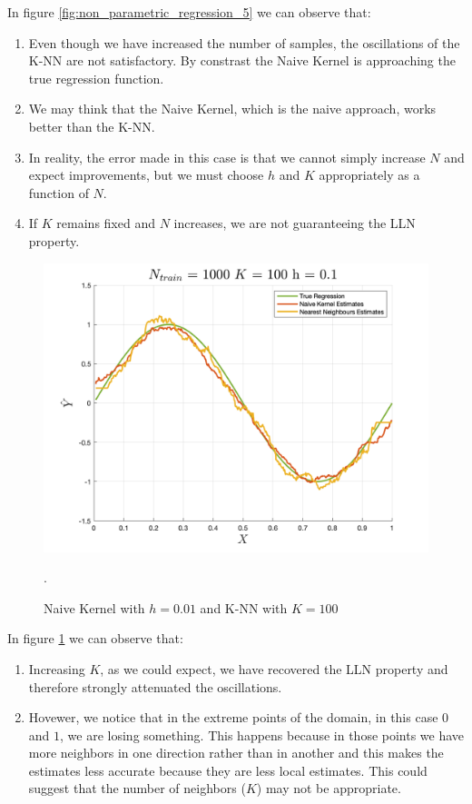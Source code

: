 In figure \ref*{fig:non_parametric_regression_5} we can observe that:
\begin{enumerate}
    \item Even though we have increased the number of samples, the oscillations of the K-NN are not satisfactory. By constrast the Naive Kernel is approaching the true regression function.
    \item We may think that the Naive Kernel, which is the naive approach, works better than the K-NN.
    \item In reality, the error made in this case is that we cannot simply increase $N$ and expect improvements, but we must choose $h$ and $K$ appropriately as a function of $N$.
    \item If $K$ remains fixed and $N$ increases, we are not guaranteeing the LLN property.
\end{enumerate}

\begin{figure}[H]
    \centering
    \includegraphics[width=\textwidth]{./figures/appendix_a/figure_20.png}
    \caption{Naive Kernel with $h=0.01$ and K-NN with $K=100$}.
    \label{fig:non_parametric_regression_6}
\end{figure}

In figure \ref*{fig:non_parametric_regression_6} we can observe that:
\begin{enumerate}
    \item Increasing $K$, as we could expect, we have recovered the LLN property and therefore strongly attenuated the oscillations.
    \item Hovewer, we notice that in the extreme points of the domain, in this case $0$ and $1$, we are losing something. This happens because in those points we have more neighbors in one direction rather than in another and this makes the estimates less accurate because they are less local estimates. This could suggest that the number of neighbors ($K$) may not be appropriate.
\end{enumerate}

